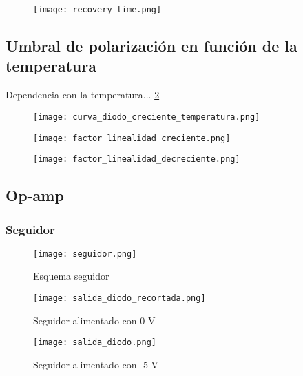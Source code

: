 \documentclass[a4paper, 11pt]{article}
\begin{document}
\begin{figure} [H]
\centering
\texttt{[image: recovery\_time.png]}
\caption{ \label{fig:recovery_time}}
\end{figure} 

\subsection*{Umbral de polarización en función de la temperatura}
Dependencia con la temperatura... \ref{fig:curva_diodo_creciente_temperatura}


\begin{figure} [H]
\centering
\texttt{[image: curva\_diodo\_creciente\_temperatura.png]}
\caption{ \label{fig:curva_diodo_creciente_temperatura}}
\end{figure} 

\begin{figure} [H]
\centering
\texttt{[image: factor\_linealidad\_creciente.png]}
\caption{ \label{fig:factor_linealidad_creciente}}
\end{figure} 

\begin{figure} [H]
\centering
\texttt{[image: factor\_linealidad\_decreciente.png]}
\caption{ \label{fig:factor_linealidad_decreciente}}
\end{figure} 



\subsection*{Op-amp}

\subsubsection*{Seguidor}

\begin{figure} [H]
\centering
\texttt{[image: seguidor.png]}
\caption{ Esquema seguidor\label{fig:seguidor}}
\end{figure} 

\begin{figure} [H]
\centering
\texttt{[image: salida\_diodo\_recortada.png]}
\caption{ Seguidor alimentado con 0 V\label{fig:salida_diodo_recortada}}
\end{figure} 

\begin{figure} [H]
\centering
\texttt{[image: salida\_diodo.png]}
\caption{ Seguidor alimentado con -5 V\label{fig:salida_diodo}}
\end{figure} 
\end{document}
